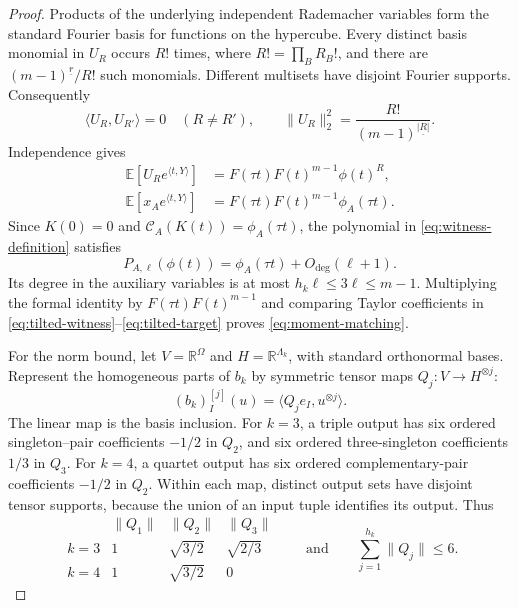 \documentclass[11pt]{article}
\newcommand{\E}{\mathbb E}
\newcommand{\R}{\mathbb R}
\begin{document}
\begin{proof}
Products of the underlying independent Rademacher variables form the standard Fourier basis for functions on the hypercube.
Every distinct basis monomial in \(U_R\) occurs \(R!\) times, where \(R!=\prod_B R_B!\), and there are \((m-1)^{\underline r}/R!\) such monomials.
Different multisets have disjoint Fourier supports.
Consequently
\begin{equation}\label{eq:orthogonality}
\langle U_R,U_{R'}\rangle=0\quad(R\ne R'),
\qquad
\|U_R\|_2^2=\frac{R!}{(m-1)^{\underline{|R|}}}.
\end{equation}
Independence gives
\begin{align}
\E[U_Re^{\langle t,Y\rangle}]
&=F(\tau t)F(t)^{m-1}\phi(t)^R,
\label{eq:tilted-witness}\\
\E[x_Ae^{\langle t,Y\rangle}]
&=F(\tau t)F(t)^{m-1}\phi_A(\tau t).
\label{eq:tilted-target}
\end{align}
Since \(K(0)=0\) and \(\mathcal C_A(K(t))=\phi_A(\tau t)\), the polynomial in \eqref{eq:witness-definition} satisfies
\[
P_{A,\ell}(\phi(t))=\phi_A(\tau t)+O_{\deg}(\ell+1).
\]
Its degree in the auxiliary variables is at most \(h_k\ell\le3\ell\le m-1\).
Multiplying the formal identity by \(F(\tau t)F(t)^{m-1}\) and comparing Taylor coefficients in \eqref{eq:tilted-witness}--\eqref{eq:tilted-target} proves \eqref{eq:moment-matching}.

For the norm bound, let \(V=\R^\Omega\) and \(H=\R^{\Lambda_k}\), with standard orthonormal bases.
Represent the homogeneous parts of \(b_k\) by symmetric tensor maps \(Q_j:V\to H^{\otimes j}\):
\[
(b_k)_I^{[j]}(u)=\langle Q_je_I,u^{\otimes j}\rangle.
\]
The linear map is the basis inclusion.
For \(k=3\), a triple output has six ordered singleton--pair coefficients \(-1/2\) in \(Q_2\), and six ordered three-singleton coefficients \(1/3\) in \(Q_3\).
For \(k=4\), a quartet output has six ordered complementary-pair coefficients \(-1/2\) in \(Q_2\).
Within each map, distinct output sets have disjoint tensor supports, because the union of an input tuple identifies its output.
Thus
\begin{equation}\label{eq:map-norms}
\begin{array}{c|ccc}
&\|Q_1\|&\|Q_2\|&\|Q_3\|\\ \hline
k=3&1&\sqrt{3/2}&\sqrt{2/3}\\
k=4&1&\sqrt{3/2}&0
\end{array}
\qquad\text{and}\qquad
\sum_{j=1}^{h_k}\|Q_j\|\le6.
\end{equation}


\end{proof}
\end{document}
